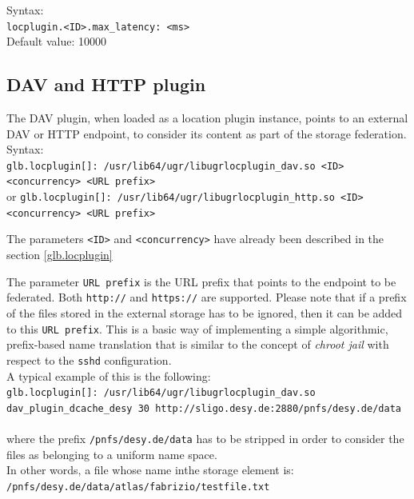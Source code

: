 \documentclass[12pt]{article} %
\begin{document}
Syntax:\\
\lstinline"locplugin.<ID>.max_latency: <ms>"\\
Default value: 10000\\

\subsection{DAV and HTTP plugin}

The DAV plugin, when loaded as a location plugin instance, points to an external DAV or HTTP endpoint, to consider its content as part of the storage federation.\\

Syntax:\\
\lstinline"glb.locplugin[]: /usr/lib64/ugr/libugrlocplugin_dav.so <ID> <concurrency> <URL prefix>"\\
or
\lstinline"glb.locplugin[]: /usr/lib64/ugr/libugrlocplugin_http.so <ID> <concurrency> <URL prefix>"


The parameters \lstinline"<ID>" and \lstinline"<concurrency>" have already been described in the section \ref{glb.locplugin}

The parameter \lstinline"URL prefix" is the URL prefix that points to the endpoint to be federated. Both \lstinline"http://" and \lstinline"https://" are supported. Please note that if a prefix of the files stored in the external storage has to be ignored, then it can be added to this \lstinline"URL prefix". This is a basic way of implementing a simple algorithmic, prefix-based name translation that is similar to the concept of \textit{chroot jail} with respect to the \lstinline"sshd" configuration.\\

A typical example of this is the following:\\
\lstinline"glb.locplugin[]: /usr/lib64/ugr/libugrlocplugin_dav.so dav_plugin_dcache_desy 30 http://sligo.desy.de:2880/pnfs/desy.de/data"\\ \\

where the prefix \lstinline"/pnfs/desy.de/data" has to be stripped in order to consider the files as belonging to a uniform name space.\\

In other words, a file whose name inthe storage element is:\\
\lstinline"/pnfs/desy.de/data/atlas/fabrizio/testfile.txt"\\
\end{document}
